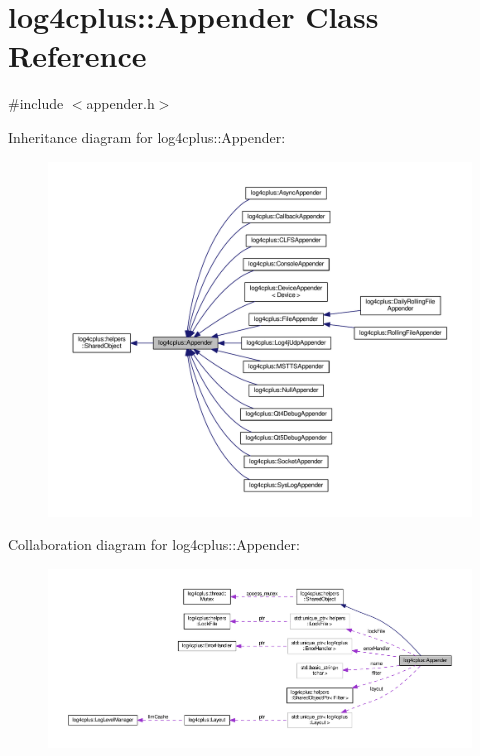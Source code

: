 \hypertarget{classlog4cplus_1_1Appender}{\section{log4cplus\-:\-:Appender Class Reference}
\label{classlog4cplus_1_1Appender}
}


{\ttfamily \#include $<$appender.\-h$>$}



Inheritance diagram for log4cplus\-:\-:Appender\-:
\nopagebreak
\begin{figure}[H]
\begin{center}
\leavevmode
\includegraphics[width=350pt]{classlog4cplus_1_1Appender__inherit__graph}
\end{center}
\end{figure}


Collaboration diagram for log4cplus\-:\-:Appender\-:
\nopagebreak
\begin{figure}[H]
\begin{center}
\leavevmode
\includegraphics[width=350pt]{classlog4cplus_1_1Appender__coll__graph}
\end{center}
\end{figure}
